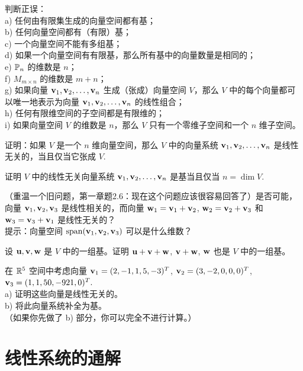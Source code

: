 \begin{problemset}
\item \label{ex:02-05-01} 判断正误：
\\
a) 任何由有限集生成的向量空间都有基；
\\
b) 任何向量空间都有（有限）基；
\\
c) 一个向量空间不能有多组基；
\\
d) 如果一个向量空间有有限基，那么所有基中的向量数量是相同的；
\\
e) $\mathbb{P}_n$ 的维数是 $n$；
\\
f) $M_{m \times n}$ 的维数是 $m+n$；
\\
g) 如果向量 $\mathbf{v}_1, \mathbf{v}_2, \dots, \mathbf{v}_n$ 生成（张成）向量空间 $V$，那么 $V$ 中的每个向量都可以唯一地表示为向量 $\mathbf{v}_1, \mathbf{v}_2, \dots, \mathbf{v}_n$ 的线性组合；
\\
h) 任何有限维空间的子空间都是有限维的；
\\
i) 如果向量空间 $V$ 的维数是 $n$，那么 $V$ 只有一个零维子空间和一个 $n$ 维子空间。
\item \label{ex:02-05-02} 证明：如果 $V$ 是一个 $n$ 维向量空间，那么 $V$ 中的向量系统 $\mathbf{v}_1, \mathbf{v}_2, \dots, \mathbf{v}_n$ 是线性无关的，当且仅当它张成 $V$. ~
\item \label{ex:02-05-03} 证明 $V$ 中的线性无关向量系统 $\mathbf{v}_1, \mathbf{v}_2, \dots, \mathbf{v}_n$ 是基当且仅当 $n = \dim V$. ~
\item \label{ex:02-05-04} （重温一个旧问题，第一章题2.6：现在这个问题应该很容易回答了）是否可能，向量 $\mathbf{v}_1, \mathbf{v}_2, \mathbf{v}_3$ 是线性相关的，而向量 $\mathbf{w}_1 = \mathbf{v}_1 + \mathbf{v}_2$, $\mathbf{w}_2 = \mathbf{v}_2 + \mathbf{v}_3$ 和 $\mathbf{w}_3 = \mathbf{v}_3 + \mathbf{v}_1$ 是线性无关的？\\ {\heiti 提示}：向量空间 $\operatorname{span}(\mathbf{v}_1, \mathbf{v}_2, \mathbf{v}_3)$ 可以是什么维数？
\item \label{ex:02-05-05} 设 $\mathbf{u}, \mathbf{v}, \mathbf{w}$ 是 $V$ 中的一组基。证明 $\mathbf{u}+\mathbf{v}+\mathbf{w}$, $\mathbf{v}+\mathbf{w}$, $\mathbf{w}$ 也是 $V$ 中的一组基。
\item \label{ex:02-05-06} 在 $\mathbb{R}^5$ 空间中考虑向量 $\mathbf{v}_1 = (2, -1, 1, 5, -3)^T$, $\mathbf{v}_2 = (3, -2, 0, 0, 0)^T$, $\mathbf{v}_3 = (1, 1, 50, -921, 0)^T.$
\\
a) 证明这些向量是线性无关的。
\\
b) 将此向量系统补全为基。
\\
（如果你先做了 b) 部分，你可以完全不进行计算。）

\end{problemset}

\section{线性系统的通解}\label{sec:02-06}

